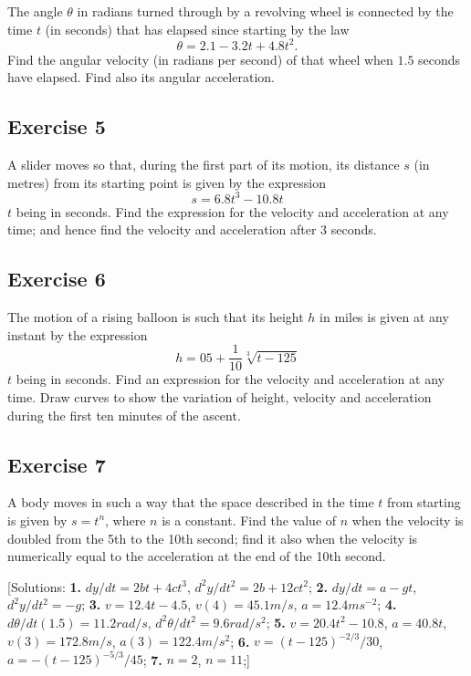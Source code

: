\documentclass[
  11pt,
  oneside]{book}
\newcommand{\slide}{}
\theoremstyle{definition}
\theoremstyle{definition}
\theoremstyle{definition}
\theoremstyle{definition}
\theoremstyle{remark}
\begin{document}
The angle \(\theta\) in radians turned through by a revolving wheel is connected by the time \(t\) (in seconds) that has elapsed since starting by the law
\[
\theta = 2.1 - 3.2t + 4.8t^2.
\]
Find the angular velocity (in radians per second) of that wheel when \(1.5\) seconds have elapsed. Find also its angular acceleration.

\slide

\subsection*{Exercise 5}\label{exercise-5-1}

A slider moves so that, during the first part of its motion, its distance \(s\) (in metres) from its starting point is given by the expression
\[
s = 6.8t^3 - 10.8t
\]
\(t\) being in seconds. Find the expression for the velocity and acceleration at any time; and hence find the velocity and acceleration after \(3\) seconds.

\slide

\subsection*{Exercise 6}\label{exercise-6-1}

The motion of a rising balloon is such that its height \(h\) in miles is given at any instant by the expression
\[
h = 05+ \frac1{10}\sqrt[3]{t-125}
\]
\(t\) being in seconds. Find an expression for the velocity and acceleration at any time. Draw curves to show the variation of height, velocity and acceleration during the first ten minutes of the ascent.

\slide

\subsection*{Exercise 7}\label{exercise-7}

A body moves in such a way that the space described in the time \(t\) from starting is given by \(s = t^n\), where \(n\) is a constant. Find the value of \(n\) when the velocity is doubled from the 5th to the 10th second; find it also when the velocity is numerically equal to the acceleration at the end of the 10th second.

{[}Solutions:
\textbf{1.} \(dy/dt=2bt+4ct^3\), \(d^2y/dt^2=2b+12ct^2\);
\textbf{2.} \(dy/dt=a-gt\), \(d^2y/dt^2=-g\);
\textbf{3.} \(v=12.4t-4.5\), \(v(4)=45.1m/s\), \(a=12.4ms^{-2}\);
\textbf{4.} \(d\theta/dt(1.5)=11.2rad/s\), \(d^2\theta/dt^2 = 9.6rad/s^2\);
\textbf{5.} \(v=20.4t^2-10.8\), \(a=40.8t\), \(v(3)=172.8m/s\), \(a(3)=122.4m/s^2\);
\textbf{6.} \(v=(t-125)^{-2/3}/30\), \(a=-(t-125)^{-5/3}/45\);
\textbf{7.} \(n=2\), \(n=11\);{]}
\end{document}
